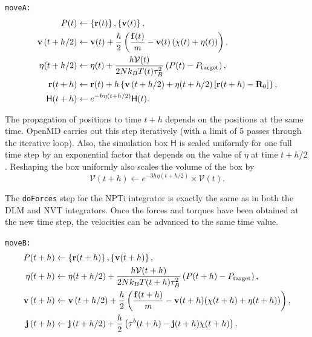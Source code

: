 \documentclass[letterpaper]{report}
\begin{document}
{\tt moveA:}
\begin{align*}
P(t) &\leftarrow \left\{{\bf r}(t)\right\}, \left\{{\bf v}(t)\right\} ,\\
%
{\bf v}\left(t + h / 2\right)  &\leftarrow {\bf v}(t) 
	+ \frac{h}{2} \left( \frac{{\bf f}(t)}{m} - {\bf v}(t)
	\left(\chi(t) + \eta(t) \right) \right), \\
%
\eta(t + h / 2) &\leftarrow \eta(t) + \frac{h 
	\mathcal{V}(t)}{2 N k_B T(t) \tau_B^2} \left( P(t) 
	- P_{\mathrm{target}} \right), \\ 
%
{\bf r}(t + h) &\leftarrow {\bf r}(t) + h 
	\left\{ {\bf v}\left(t + h / 2 \right) 
	+ \eta(t + h / 2)\left[ {\bf r}(t + h) 
	- {\bf R}_0 \right] \right\} ,\\
%
\mathsf{H}(t + h) &\leftarrow e^{-h \eta(t + h / 2)} 
	\mathsf{H}(t).
\end{align*}

The propagation of positions to time $t + h$
depends on the positions at the same time.  OpenMD carries out
this step iteratively (with a limit of 5 passes through the iterative
loop).  Also, the simulation box $\mathsf{H}$ is scaled uniformly for
one full time step by an exponential factor that depends on the value
of $\eta$ at time $t +
h / 2$.  Reshaping the box uniformly also scales the volume of
the box by
\begin{equation}
\mathcal{V}(t + h) \leftarrow e^{ - 3 h \eta(t + h /2)} \times
\mathcal{V}(t).
\end{equation}

The {\tt doForces} step for the NPTi integrator is exactly the same as
in both the DLM and NVT integrators.  Once the forces and torques have
been obtained at the new time step, the velocities can be advanced to
the same time value.

{\tt moveB:}
\begin{align*}
P(t + h) &\leftarrow  \left\{{\bf r}(t + h)\right\},
	\left\{{\bf v}(t + h)\right\}, \\
%
\eta(t + h) &\leftarrow \eta(t + h / 2) +
	\frac{h \mathcal{V}(t + h)}{2 N k_B T(t + h) 
	\tau_B^2} \left( P(t + h) - P_{\mathrm{target}} \right), \\ 
%
{\bf v}\left(t + h \right)  &\leftarrow {\bf v}\left(t 
	+ h / 2 \right) + \frac{h}{2} \left(
	\frac{{\bf f}(t + h)}{m} - {\bf v}(t + h)
	(\chi(t + h) + \eta(t + h)) \right) ,\\
%
{\bf j}\left(t + h \right)  &\leftarrow {\bf j}\left(t 
	+ h / 2 \right) + \frac{h}{2} \left( {\bf
	\tau}^b(t + h) - {\bf j}(t + h)
	\chi(t + h) \right) .
\end{align*}
\end{document}
